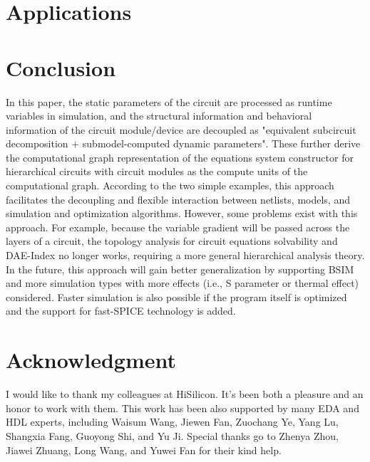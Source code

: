 \documentclass{article}
\begin{document}
\section{Applications}\label{sec:applications}


\section{Conclusion}
In this paper, the static parameters of the circuit are processed as runtime variables in simulation, and the structural information and behavioral information of the circuit module/device are decoupled as "equivalent subcircuit decomposition + submodel-computed dynamic parameters". These further derive the computational graph representation of the equations system constructor for hierarchical circuits with circuit modules as the compute units of the computational graph. According to the two simple examples, this approach facilitates the decoupling and flexible interaction between netlists, models, and simulation and optimization algorithms. However, some problems exist with this approach. For example, because the variable gradient will be passed across the layers of a circuit, the topology analysis for circuit equations solvability and DAE-Index no longer works, requiring a more general hierarchical analysis theory. In the future, this approach will gain better generalization by supporting BSIM and more simulation types with more effects (i.e., S parameter or thermal effect) considered. Faster simulation is also possible if the program itself is optimized and the support for fast-SPICE technology is added.

\section*{Acknowledgment}
I would like to thank my colleagues at HiSilicon. It's been both a pleasure and an honor to work with them. This work has been also supported by many EDA and HDL experts, including Waisum Wang, Jiewen Fan, Zuochang Ye, Yang Lu, Shangxia Fang, Guoyong Shi, and Yu Ji. Special thanks go to Zhenya Zhou, Jiawei Zhuang, Long Wang, and Yuwei Fan for their kind help.




\end{document}
